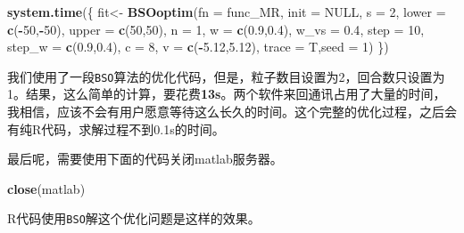 \documentclass[]{ctexbook}
\newenvironment{Shaded}{\begin{snugshade}}{\end{snugshade}}
\newcommand{\KeywordTok}[1]{\textcolor[rgb]{0.13,0.29,0.53}{\textbf{#1}}}
\newcommand{\DataTypeTok}[1]{\textcolor[rgb]{0.13,0.29,0.53}{#1}}
\newcommand{\DecValTok}[1]{\textcolor[rgb]{0.00,0.00,0.81}{#1}}
\newcommand{\FloatTok}[1]{\textcolor[rgb]{0.00,0.00,0.81}{#1}}
\newcommand{\StringTok}[1]{\textcolor[rgb]{0.31,0.60,0.02}{#1}}
\newcommand{\OtherTok}[1]{\textcolor[rgb]{0.56,0.35,0.01}{#1}}
\newcommand{\OperatorTok}[1]{\textcolor[rgb]{0.81,0.36,0.00}{\textbf{#1}}}
\newcommand{\NormalTok}[1]{#1}
\theoremstyle{definition}
\theoremstyle{definition}
\theoremstyle{definition}
\theoremstyle{remark}
\begin{document}
\begin{Shaded}
\begin{Highlighting}[]
\KeywordTok{system.time}\NormalTok{(\{}
\NormalTok{  fit<-}
\StringTok{    }\KeywordTok{BSOoptim}\NormalTok{(}\DataTypeTok{fn =}\NormalTok{ func_MR,}
             \DataTypeTok{init =} \OtherTok{NULL}\NormalTok{,}
             \DataTypeTok{s =} \DecValTok{2}\NormalTok{,}
             \DataTypeTok{lower =} \KeywordTok{c}\NormalTok{(}\OperatorTok{-}\DecValTok{50}\NormalTok{,}\OperatorTok{-}\DecValTok{50}\NormalTok{),}
             \DataTypeTok{upper =} \KeywordTok{c}\NormalTok{(}\DecValTok{50}\NormalTok{,}\DecValTok{50}\NormalTok{),}
             \DataTypeTok{n =} \DecValTok{1}\NormalTok{,}
             \DataTypeTok{w =} \KeywordTok{c}\NormalTok{(}\FloatTok{0.9}\NormalTok{,}\FloatTok{0.4}\NormalTok{),}
             \DataTypeTok{w_vs =} \FloatTok{0.4}\NormalTok{, }
             \DataTypeTok{step =} \DecValTok{10}\NormalTok{,}
             \DataTypeTok{step_w =} \KeywordTok{c}\NormalTok{(}\FloatTok{0.9}\NormalTok{,}\FloatTok{0.4}\NormalTok{),}
             \DataTypeTok{c =} \DecValTok{8}\NormalTok{,}
             \DataTypeTok{v =} \KeywordTok{c}\NormalTok{(}\OperatorTok{-}\FloatTok{5.12}\NormalTok{,}\FloatTok{5.12}\NormalTok{),}
             \DataTypeTok{trace =}\NormalTok{ T,}\DataTypeTok{seed =} \DecValTok{1}\NormalTok{)}
\NormalTok{\}) }
\end{Highlighting}
\end{Shaded}

我们使用了一段\texttt{BSO}算法的优化代码，但是，粒子数目设置为2，回合数只设置为1。结果，这么简单的计算，要花费\textbf{13s}。两个软件来回通讯占用了大量的时间，我相信，应该不会有用户愿意等待这么长久的时间。这个完整的优化过程，之后会有纯R代码，求解过程不到0.1s的时间。

最后呢，需要使用下面的代码关闭matlab服务器。

\begin{Shaded}
\begin{Highlighting}[]
\KeywordTok{close}\NormalTok{(matlab)}
\end{Highlighting}
\end{Shaded}

R代码使用\texttt{BSO}解这个优化问题是这样的效果。
\end{document}
